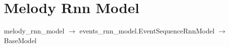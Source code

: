 \documentclass{article}
\begin{document}
	\section{Melody Rnn Model}
	melody\_rnn\_model $\rightarrow$  events\_rnn\_model.EventSequenceRnnModel $\rightarrow$ BaseModel
\end{document}
